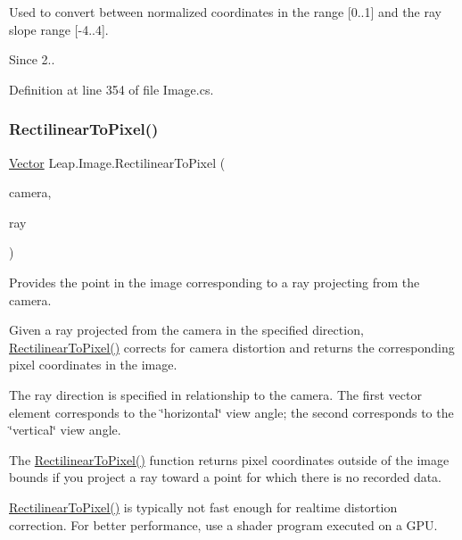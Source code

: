 Used to convert between normalized coordinates in the range \mbox{[}0..1\mbox{]} and the ray slope range \mbox{[}-\/4..4\mbox{]}.

\begin{DoxySince}{Since}
2.. 
\end{DoxySince}


Definition at line 354 of file Image.\+cs.

\mbox{\label{class_leap_1_1_image_ab2cb673a34f6fc61e504748887a8f144}} 
\subsubsection{\texorpdfstring{RectilinearToPixel()}{RectilinearToPixel()}}
{\footnotesize\ttfamily \mbox{\hyperlink{struct_leap_1_1_vector}{Vector}} Leap.\+Image.\+Rectilinear\+To\+Pixel (\begin{DoxyParamCaption}\item[{\mbox{\hyperlink{class_leap_1_1_image_a28310e43e0f2d7f7117e1b45330bdc38}{Camera\+Type}}}]{camera,  }\item[{\mbox{\hyperlink{struct_leap_1_1_vector}{Vector}}}]{ray }\end{DoxyParamCaption})}



Provides the point in the image corresponding to a ray projecting from the camera. 

Given a ray projected from the camera in the specified direction, \mbox{\hyperlink{class_leap_1_1_image_ab2cb673a34f6fc61e504748887a8f144}{Rectilinear\+To\+Pixel()}} corrects for camera distortion and returns the corresponding pixel coordinates in the image.

The ray direction is specified in relationship to the camera. The first vector element corresponds to the \char`\"{}horizontal\char`\"{} view angle; the second corresponds to the \char`\"{}vertical\char`\"{} view angle.

The \mbox{\hyperlink{class_leap_1_1_image_ab2cb673a34f6fc61e504748887a8f144}{Rectilinear\+To\+Pixel()}} function returns pixel coordinates outside of the image bounds if you project a ray toward a point for which there is no recorded data.

\mbox{\hyperlink{class_leap_1_1_image_ab2cb673a34f6fc61e504748887a8f144}{Rectilinear\+To\+Pixel()}} is typically not fast enough for realtime distortion correction. For better performance, use a shader program executed on a G\+PU.

